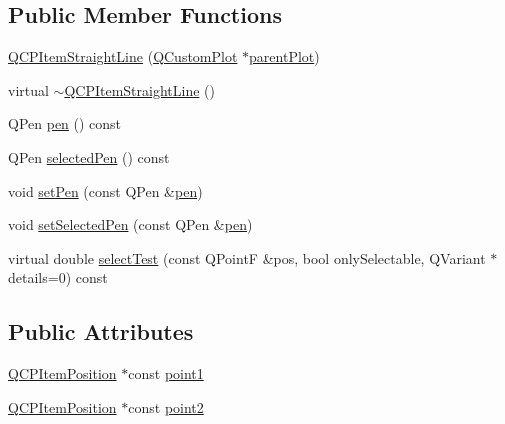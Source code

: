 \subsection*{Public Member Functions}
\begin{DoxyCompactItemize}
\item 
\hyperlink{class_q_c_p_item_straight_line_a41fd2e1f006983449eca9830930c3b10}{Q\+C\+P\+Item\+Straight\+Line} (\hyperlink{class_q_custom_plot}{Q\+Custom\+Plot} $\ast$\hyperlink{class_q_c_p_layerable_ab7e0e94461566093d36ffc0f5312b109}{parent\+Plot})
\item 
virtual \hyperlink{class_q_c_p_item_straight_line_a1f0730759916ce203baeaad1ad2af3ea}{$\sim$\+Q\+C\+P\+Item\+Straight\+Line} ()
\item 
Q\+Pen \hyperlink{class_q_c_p_item_straight_line_ad858ab1a444391aab778f765453ea222}{pen} () const 
\item 
Q\+Pen \hyperlink{class_q_c_p_item_straight_line_a9e33ae966a7e2ea1083b3b9aeabeaea5}{selected\+Pen} () const 
\item 
void \hyperlink{class_q_c_p_item_straight_line_a9f36c9c9e60d7d9ac084c80380ac8601}{set\+Pen} (const Q\+Pen \&\hyperlink{class_q_c_p_item_straight_line_ad858ab1a444391aab778f765453ea222}{pen})
\item 
void \hyperlink{class_q_c_p_item_straight_line_a5c33559498d33543fa95cf0a36e851ff}{set\+Selected\+Pen} (const Q\+Pen \&\hyperlink{class_q_c_p_item_straight_line_ad858ab1a444391aab778f765453ea222}{pen})
\item 
virtual double \hyperlink{class_q_c_p_item_straight_line_a64cc3796f58ce856012732603edb2f1c}{select\+Test} (const Q\+Point\+F \&pos, bool only\+Selectable, Q\+Variant $\ast$details=0) const 
\end{DoxyCompactItemize}
\subsection*{Public Attributes}
\begin{DoxyCompactItemize}
\item 
\hyperlink{class_q_c_p_item_position}{Q\+C\+P\+Item\+Position} $\ast$const \hyperlink{class_q_c_p_item_straight_line_ac131a6ffe456f2cc7364dce541fe0120}{point1}
\item 
\hyperlink{class_q_c_p_item_position}{Q\+C\+P\+Item\+Position} $\ast$const \hyperlink{class_q_c_p_item_straight_line_ad26c0a732e471f63f75d481dcd48cfc9}{point2}
\end{DoxyCompactItemize}
